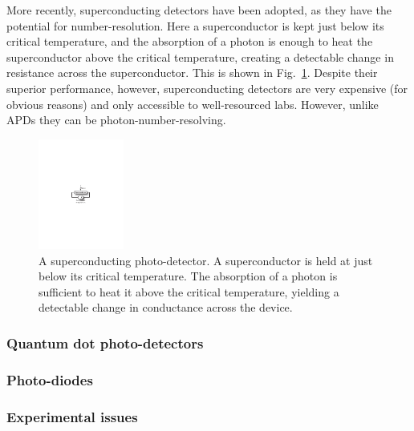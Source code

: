 More recently, superconducting detectors have been adopted, as they have the potential for number-resolution. Here a superconductor is kept just below its critical temperature, and the absorption of a photon is enough to heat the superconductor above the critical temperature, creating a detectable change in resistance across the superconductor. This is shown in Fig.~\ref{fig:super_det}. Despite their superior performance, however, superconducting detectors are very expensive (for obvious reasons) and only accessible to well-resourced labs. However, unlike APDs they can be photon-number-resolving.

\begin{figure}[htpb]
\includegraphics[width=0.25\textwidth]{superconducting_detector}
\caption{A superconducting photo-detector. A superconductor is held at just below its critical temperature. The absorption of a photon is sufficient to heat it above the critical temperature, yielding a detectable change in conductance across the device.} \label{fig:super_det}
\end{figure}


%
%

\subsubsection{Quantum dot photo-detectors}


%
%

\subsubsection{Photo-diodes}


%
%

\subsubsection{Experimental issues}

